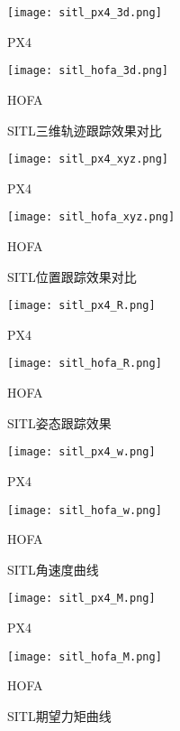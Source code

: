\begin{figure}[H]
  \centering
  \begin{minipage}[b]{0.49\linewidth}
      \texttt{[image: sitl\_px4\_3d.png]}
      \caption*{PX4}
  \end{minipage}
  \hfill %
  \begin{minipage}[b]{0.49\linewidth}
      \texttt{[image: sitl\_hofa\_3d.png]}
      \caption*{HOFA}
  \end{minipage}
  \caption{SITL三维轨迹跟踪效果对比}
\end{figure}

\newpage


  \begin{figure}[H]
    \centering
  \begin{minipage}[b]{0.49\linewidth}
      \texttt{[image: sitl\_px4\_xyz.png]}
      \caption*{PX4}
  \end{minipage}
  \hfill
  \begin{minipage}[b]{0.49\linewidth}
      \texttt{[image: sitl\_hofa\_xyz.png]}
      \caption*{HOFA}
  \end{minipage}
  \caption{SITL位置跟踪效果对比}
\end{figure}

\begin{figure}[H]
  \centering
\begin{minipage}[b]{0.49\linewidth}
    \texttt{[image: sitl\_px4\_R.png]}
    \caption*{PX4}
\end{minipage}
\hfill
\begin{minipage}[b]{0.49\linewidth}
    \texttt{[image: sitl\_hofa\_R.png]}
    \caption*{HOFA}
\end{minipage}
\caption{SITL姿态跟踪效果}
\end{figure}

\begin{figure}[H]
  \centering
\begin{minipage}[b]{0.49\linewidth}
    \texttt{[image: sitl\_px4\_w.png]}
    \caption{PX4}
\end{minipage}
\hfill
\begin{minipage}[b]{0.49\linewidth}
    \texttt{[image: sitl\_hofa\_w.png]}
    \caption*{HOFA}
\end{minipage}
\caption{SITL角速度曲线}
\end{figure}


\begin{figure}[H]
  \centering
\begin{minipage}[b]{0.49\linewidth}
    \texttt{[image: sitl\_px4\_M.png]}
    \caption*{PX4}
\end{minipage}
\hfill
\begin{minipage}[b]{0.49\linewidth}
    \texttt{[image: sitl\_hofa\_M.png]}
    \caption*{HOFA}
\end{minipage}
\caption{SITL期望力矩曲线}
\end{figure}

